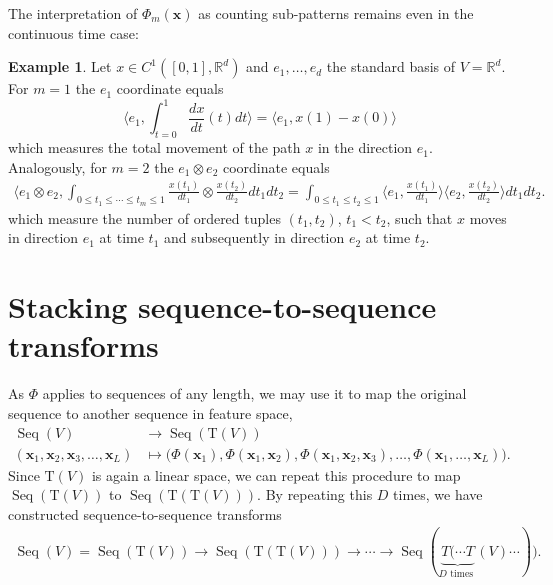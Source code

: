 \documentclass{article} \usepackage{iclr2021_conference,times}
\newcommand{\R}{\mathbb{R}}
\newcommand{\bx}{\mathbf{x}}
\newcommand{\T}[1]{\mathrm{T}({#1})}
\newcommand{\Seq}[1]{\operatorname{Seq}(#1)}
\theoremstyle{plain}
\theoremstyle{definition}
\newtheorem{example}[thm]{Example}
\begin{document}
The interpretation of $\Phi_m(\bx)$ as counting sub-patterns remains even in the continuous time case: 
\begin{example}\label{ex: signature pattern}
Let $x \in C^1([0,1],\R^d)$ and $e_1,\ldots,e_d$ the standard basis of $V=\R^d$.  
For $m=1$ the $e_1$ coordinate equals 
\[\langle e_1, \int_{t = 0}^1 \frac{dx}{dt}(t) dt \rangle =  \langle e_1, x(1)-x(0) \rangle\]
which measures the total movement of the path $ x $ in the direction $ e_1 $.
Analogously, for $m=2$ the $e_1 \otimes e_2$ coordinate equals
\begin{align}
  \langle e_1 \otimes e_2, \int_{0 \le t_1 \le \cdots \le t_m \le 1} \frac{x(t_1)}{dt_1} \otimes \frac{x(t_2)}{dt_2} dt_1 dt_2= \int_{0 \le t_1 \le t_2 \le 1} \langle e_1, \frac{x(t_1)}{dt_1} \rangle \langle e_2, \frac{x(t_2)}{dt_2}\rangle dt_1 dt_2.   
\end{align}
which measure the number of ordered tuples $(t_1,t_2)$, $t_1 < t_2$, such that $x$ moves in direction $e_1$ at time $t_1$ and subsequently in direction $e_2$ at time $t_2$.
\end{example}

\section{Stacking sequence-to-sequence transforms}\label{app:iterated}
As $\Phi$ applies to sequences of any length, we may use it to map the original sequence to another sequence in feature space,
	\begin{align} 
	\Seq{V} &\rightarrow \Seq{\T{V}}\\
	(\bx_1,\bx_2,\bx_3,\ldots, \bx_L) &\mapsto \Big(\Phi(\bx_1),\Phi(\bx_1, \bx_2), \Phi(\bx_1, \bx_2, \bx_3), \ldots, \Phi(\bx_1,\ldots,\bx_L) \Big).
	\end{align}
	Since $\T{V}$ is again a linear space, we can repeat this procedure to map $\Seq{\T{V}} $ to $ \Seq{\T{\T{V}}}$.
	By repeating this $D$ times, we have constructed sequence-to-sequence transforms 
	\begin{align}\label{eq:seq2seq}
	\Seq{V}=\Seq{\T{V}} \rightarrow \Seq{\T{\T{V}}} \rightarrow \cdots \rightarrow \Seq{\underbrace{T(\cdots T}_{D \text{ times }}(V)\cdots )}.
	\end{align}
	
\end{document}
